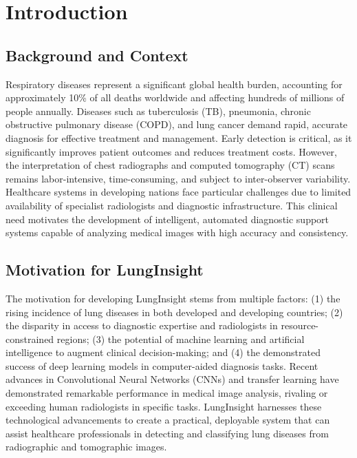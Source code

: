 \chapter{Introduction}\thispagestyle{empty}
\graphicspath{{Chapter1/figures/}}
{

\section{Background and Context}

Respiratory diseases represent a significant global health burden, accounting for approximately 10\% of all deaths worldwide and affecting hundreds of millions of people annually. Diseases such as tuberculosis (TB), pneumonia, chronic obstructive pulmonary disease (COPD), and lung cancer demand rapid, accurate diagnosis for effective treatment and management. Early detection is critical, as it significantly improves patient outcomes and reduces treatment costs. However, the interpretation of chest radiographs and computed tomography (CT) scans remains labor-intensive, time-consuming, and subject to inter-observer variability. Healthcare systems in developing nations face particular challenges due to limited availability of specialist radiologists and diagnostic infrastructure. This clinical need motivates the development of intelligent, automated diagnostic support systems capable of analyzing medical images with high accuracy and consistency.

\section{Motivation for LungInsight}

The motivation for developing LungInsight stems from multiple factors: (1) the rising incidence of lung diseases in both developed and developing countries; (2) the disparity in access to diagnostic expertise and radiologists in resource-constrained regions; (3) the potential of machine learning and artificial intelligence to augment clinical decision-making; and (4) the demonstrated success of deep learning models in computer-aided diagnosis tasks. Recent advances in Convolutional Neural Networks (CNNs) and transfer learning have demonstrated remarkable performance in medical image analysis, rivaling or exceeding human radiologists in specific tasks. LungInsight harnesses these technological advancements to create a practical, deployable system that can assist healthcare professionals in detecting and classifying lung diseases from radiographic and tomographic images.

}
